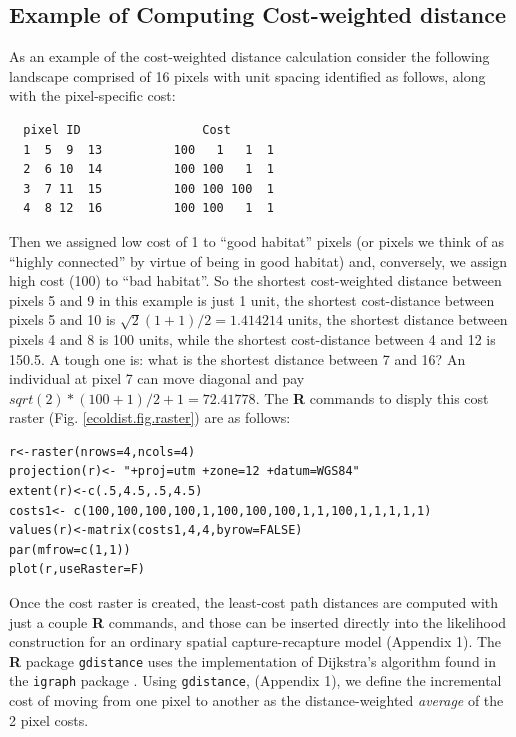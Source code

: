 \documentclass[12pt]{article}
\begin{document}
\subsection{Example of Computing Cost-weighted distance}

As an example of the cost-weighted distance calculation consider the
following landscape comprised of 16 pixels with unit spacing
identified as follows, along with the pixel-specific cost:
\begin{center}
\begin{verbatim}
  pixel ID                 Cost
  1  5  9  13          100   1   1  1
  2  6 10  14          100 100   1  1
  3  7 11  15          100 100 100  1
  4  8 12  16          100 100   1  1
\end{verbatim}
\end{center}
Then we assigned low cost of 1 to ``good habitat'' pixels (or pixels we
think of as ``highly connected'' by virtue of being in good habitat)
and, conversely, we assign high cost (100) to ``bad habitat''. So the
shortest cost-weighted distance between pixels 5 and 9 in this example
is just 1 unit, the shortest cost-distance between pixels 5 and 10 is
$\sqrt{2}(1+1)/2 = 1.414214$ units, the shortest distance between pixels 4 and 8 is 100
units, while the shortest cost-distance between 4 and 12 is 150.5. A
tough one is: what is the shortest distance between 7 and 16? An
individual at pixel 7 can move diagonal and pay  $sqrt(2)*(100+1)/2 + 1 =72.41778$.
The {\bf R} commands to disply this cost raster
(Fig. \ref{ecoldist.fig.raster})  are as follows:
\begin{verbatim}
r<-raster(nrows=4,ncols=4)
projection(r)<- "+proj=utm +zone=12 +datum=WGS84"
extent(r)<-c(.5,4.5,.5,4.5)
costs1<- c(100,100,100,100,1,100,100,100,1,1,100,1,1,1,1,1)
values(r)<-matrix(costs1,4,4,byrow=FALSE)
par(mfrow=c(1,1))
plot(r,useRaster=F)
\end{verbatim}
Once the cost raster is created, the least-cost path distances are
computed with just a couple {\bf R} commands, and those can be
inserted directly into the likelihood construction for an ordinary
spatial capture-recapture model (Appendix 1). The {\bf R} package
\mbox{\tt gdistance} uses 
 the implementation of Dijkstra's algorithm
\citep{dijkstra:1959} found in the \mbox{\tt igraph} package
\citep{csardi:2010}.
Using \mbox{\tt gdistance}, (Appendix 1),
we define the incremental cost of moving
from one pixel to another as the distance-weighted {\it
  average} of the 2 pixel costs.
\end{document}
